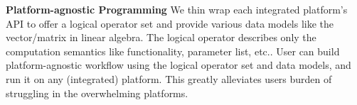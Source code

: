 








\iffalse
\textbf{Platform-agnostic Programming}   We thin wrap each integrated platform's API to offer a logical operator set and provide various data models like the vector/matrix in linear algebra. The logical operator describes only the computation semantics like functionality, parameter list, etc.. User can build platform-agnostic workflow using the logical operator set and data models, and run it on any (integrated) platform. This greatly alleviates users burden of struggling in the overwhelming platforms.

